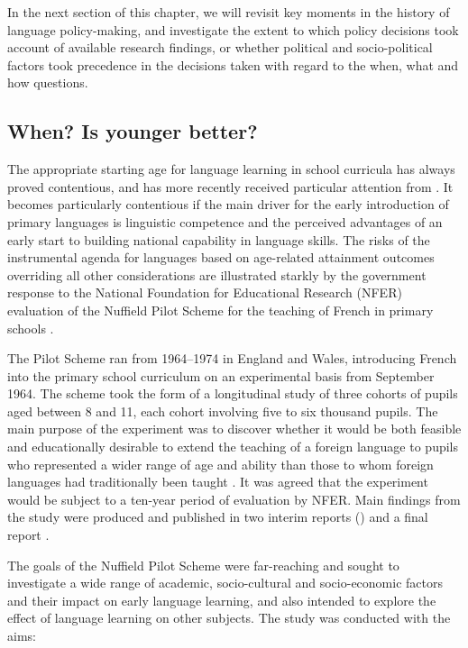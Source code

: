\documentclass[output=paper]{langscibook}
\begin{document}
In the next section of this chapter, we will revisit key moments in the history of language policy-making, and investigate the extent to which policy decisions took account of available research findings, or whether political and socio-political factors took precedence in the decisions taken with regard to the when, what and how questions. 

\subsection{When? Is younger better?}

The appropriate starting age for language learning in school curricula has always proved contentious, and has more recently received particular attention from \citeauthor{MylesEtAl2012}. It becomes particularly contentious if the main driver for the early introduction of primary languages is linguistic competence and the perceived advantages of an early start to building national capability in language skills. The risks of the instrumental agenda for languages based on age-related attainment outcomes overriding all other considerations are illustrated starkly by the government response to the National Foundation for Educational Research (NFER) evaluation of the Nuffield Pilot Scheme for the teaching of French in primary schools \citep{BurstallEtAl1974}. 

\begin{sloppypar}
The Pilot Scheme ran from 1964--1974 in England and Wales, introducing French into the primary school curriculum on an experimental basis from September 1964. The scheme took the form of a longitudinal study of three cohorts of pupils aged between 8 and 11, each cohort involving five to six thousand pupils. The main purpose of the experiment was to discover whether it would be both feasible and educationally desirable to extend the teaching of a foreign language to pupils who represented a wider range of age and ability than those to whom foreign languages had traditionally been taught \citep{Burstall1975}. It was agreed that the experiment would be subject to a ten-year period of evaluation by NFER. Main findings from the study were produced and published in two interim reports (\citealt{Burstall1968, Burstall1970}) and a final report \citep{BurstallEtAl1974}. 
\end{sloppypar}

The goals of the Nuffield Pilot Scheme were far-reaching and sought to investigate a wide range of academic, socio-cultural and socio-economic factors and their impact on early language learning, and also intended to explore the effect of language learning on other subjects. The study was conducted with the aims: 
\end{document}
